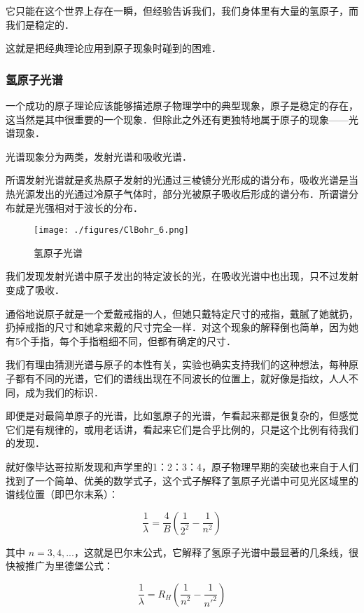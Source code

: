 它只能在这个世界上存在一瞬，但经验告诉我们，我们身体里有大量的氢原子，而我们是稳定的．

这就是把经典理论应用到原子现象时碰到的困难．

\subsubsection{氢原子光谱}


一个成功的原子理论应该能够描述原子物理学中的典型现象，原子是稳定的存在，这当然是其中很重要的一个现象．但除此之外还有更独特地属于原子的现象——光谱现象．

光谱现象分为两类，发射光谱和吸收光谱．

所谓发射光谱就是炙热原子发射的光通过三棱镜分光形成的谱分布，吸收光谱是当热光源发出的光通过冷原子气体时，部分光被原子吸收后形成的谱分布．所谓谱分布就是光强相对于波长的分布．

\begin{figure}[ht]
\centering
\texttt{[image: ./figures/ClBohr\_6.png]}
\caption{氢原子光谱} \label{ClBohr_fig6}
\end{figure}


我们发现发射光谱中原子发出的特定波长的光，在吸收光谱中也出现，只不过发射变成了吸收．

通俗地说原子就是一个爱戴戒指的人，但她只戴特定尺寸的戒指，戴腻了她就扔，扔掉戒指的尺寸和她拿来戴的尺寸完全一样．对这个现象的解释倒也简单，因为她有5个手指，每个手指粗细不同，但都有确定的尺寸．

我们有理由猜测光谱与原子的本性有关，实验也确实支持我们的这种想法，每种原子都有不同的光谱，它们的谱线出现在不同波长的位置上，就好像是指纹，人人不同，成为我们的标识．

即便是对最简单原子的光谱，比如氢原子的光谱，乍看起来都是很复杂的，但感觉它们是有规律的，或用老话讲，看起来它们是合乎比例的，只是这个比例有待我们的发现．

就好像毕达哥拉斯发现和声学里的1：2：3：4，原子物理早期的突破也来自于人们找到了一个简单、优美的数学式子，这个式子解释了氢原子光谱中可见光区域里的谱线位置（即巴尔末系）：

\begin{equation}
\frac{1}{\lambda} = \frac{4}{B} \left( \frac{1}{2^2} - \frac{1}{n^2} \right)
\end{equation}

其中 $n = 3, 4, ...$，这就是巴尔末公式，它解释了氢原子光谱中最显著的几条线，很快被推广为里德堡公式：

\begin{equation}
\frac{1}{\lambda} = R_H \left(  \frac{1}{n^2} - \frac{1}{n'^2}  \right)
\end{equation}

